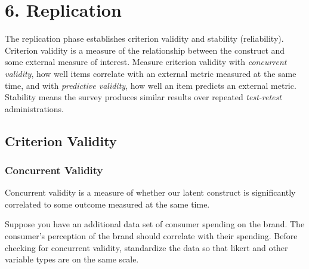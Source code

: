 \documentclass[
]{book}
\theoremstyle{definition}
\theoremstyle{definition}
\theoremstyle{definition}
\theoremstyle{definition}
\theoremstyle{remark}
\begin{document}
\hypertarget{replication}{%
\section{6. Replication}\label{replication}}

The replication phase establishes criterion validity and stability (reliability). Criterion validity is a measure of the relationship between the construct and some external measure of interest. Measure criterion validity with \emph{concurrent validity}, how well items correlate with an external metric measured at the same time, and with \emph{predictive validity}, how well an item predicts an external metric. Stability means the survey produces similar results over repeated \emph{test-retest} administrations.

\hypertarget{criterion-validity}{%
\subsection{Criterion Validity}\label{criterion-validity}}

\hypertarget{concurrent-validity}{%
\subsubsection{Concurrent Validity}\label{concurrent-validity}}

Concurrent validity is a measure of whether our latent construct is significantly correlated to some outcome measured at the same time.

Suppose you have an additional data set of consumer spending on the brand. The consumer's perception of the brand should correlate with their spending. Before checking for concurrent validity, standardize the data so that likert and other variable types are on the same scale.
\end{document}
